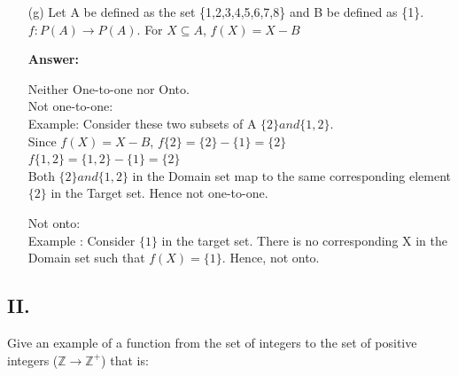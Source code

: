 \documentclass[14pt]{extreport}
\newcommand{\answer}[0]{\medskip \textbf{Answer:} \medskip}
\begin{document}
\begin{enumerate}
    \item[(g)] Let A be defined as the set \{1,2,3,4,5,6,7,8\} and B be defined as \{1\}. \\
    \(f: P\left(A\right) \to P\left(A\right)\). For \(X \subseteq A\), \(f\left(X\right) = X-B\)
    
        \answer
        
        Neither One-to-one nor Onto. \\
        
        Not one-to-one: \\
        Example: Consider these two subsets of A \(\{2\} and \{1,2\}\). \\Since \(f\left(X\right) = X-B\), 
        \newline
        \(f\{2\} = \{2\}-\{1\} = \{2\}\) \\
        \(f\{1,2\} = \{1,2\}-\{1\} = \{2\}\) \\
        Both \(\{2\} and \{1,2\}\) in the Domain set map to the same corresponding element \(\{2\}\) in the Target set. Hence not one-to-one. 
        \newline
        
        Not onto: \\
        Example : Consider \(\{1\}\) in the target set. There is no corresponding X in the Domain set such that \(f\left(X\right) = \{1\}\). Hence, not onto. 
        
\end{enumerate}

\subsection*{II.}

Give an example of a function from the set of integers to the set of positive integers ($\mathbb{Z} \rightarrow \mathbb{Z^{+}}$) that is: 
\end{document}
